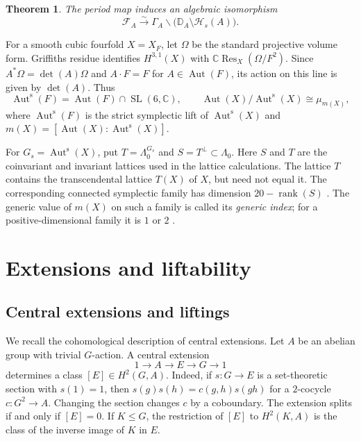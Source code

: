 \documentclass[12pt]{amsart}
\numberwithin{equation}{section}
\theoremstyle{plain}
\newtheorem{thm}{Theorem}[section]
\theoremstyle{definition}
\theoremstyle{remark}
\newcommand{\CC}{\mathbb C}
\newcommand{\DD}{\mathbb D}
\newcommand{\calF}{\mathcal F}
\newcommand{\calH}{\mathcal H}
\DeclareMathOperator{\Aut}{Aut}
\DeclareMathOperator{\SL}{SL}
\DeclareMathOperator{\rank}{rank}
\newcommand{\Auts}{\Aut^{\mathrm s}}
\begin{document}
\begin{thm}
\label{thm:equivariant-torelli}
The period map induces an algebraic isomorphism
\[
\calF_A\xrightarrow{\sim}
\Gamma_A\backslash\bigl(\DD_A\setminus\calH_s(A)\bigr).
\]
\end{thm}

For a smooth cubic fourfold $X=X_F$, let $\Omega$ be the standard
projective volume form.  Griffiths residue identifies $H^{3,1}(X)$
with $\CC\operatorname{Res}_{X}(\Omega/F^2)$.  Since
$A^*\Omega=\det(A)\Omega$ and $A\cdot F=F$ for $A\in\Aut(F)$, its
action on this line is given by $\det(A)$.  Thus
\begin{equation}\label{eq:symplectic-diagram}
\Auts(F)=\Aut(F)\cap\SL(6,\CC),
\qquad
\Aut(X)/\Auts(X)\cong\mu_{m(X)},
\end{equation}
where $\Auts(F)$ is the strict symplectic lift of $\Auts(X)$ and
$m(X)=[\Aut(X):\Auts(X)]$.

For $G_s=\Auts(X)$, put
$T=\Lambda_0^{G_s}$ and $S=T^\perp\subset\Lambda_0$.
Here $S$ and $T$ are the coinvariant and invariant lattices used in
the lattice calculations. The lattice $T$ contains the transcendental
lattice $T(X)$ of $X$, but need not equal it. The corresponding
connected symplectic family has dimension $20-\rank(S)$
\cite{yu2020moduli}\cite{laza2022automorphisms}. The generic value of
$m(X)$ on such a family is called its \emph{generic index}; for a
positive-dimensional family it is $1$ or $2$ \cite{FWZ26}\cite{FZ26}.

\section{Extensions and liftability}
\label{sec:extension-liftability}

\subsection{Central extensions and liftings}

We recall the cohomological description of central extensions. Let $A$
be an abelian group with trivial $G$-action. A central
extension
\[
1\longrightarrow A\longrightarrow E\longrightarrow G\longrightarrow1
\]
determines a class $[E]\in H^2(G,A)$.  Indeed, if $s\colon G\to E$ is a
set-theoretic section with $s(1)=1$, then
$s(g)s(h)=c(g,h)s(gh)$ for a $2$-cocycle $c\colon G^2\to A$.
Changing the section changes $c$ by a coboundary.  The extension splits if
and only if $[E]=0$.  If $K\leq G$, the restriction of $[E]$ to $H^2(K,A)$ is
the class of the inverse image of $K$ in $E$.
\end{document}
